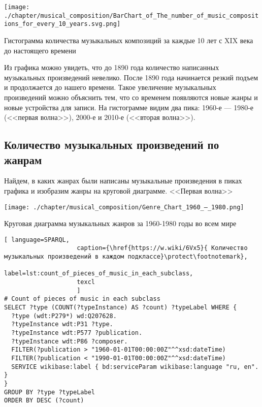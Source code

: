 \begin{marginfigure}[0\baselineskip]
	\texttt{[image: ./chapter/musical\_composition/BarChart\_of\_The\_number\_of\_music\_compositions\_for\_every\_10\_years.svg.png]}
	\caption[Гистограмма количества музыкальных композиций за каждые 10 лет с XIX века до настоящего времени]{Гистограмма количества музыкальных композиций за каждые 10 лет с XIX века до настоящего времени}%
\end{marginfigure}
Из графика можно увидеть, что до 1890 года количество написанных музыкальных произведений невелико. После 1890 года начинается резкий подъем и продолжается до нашего времени. Такое увеличение музыкальных произведений можно объяснить тем, что со временем появляются новые жанры и новые устройства для записи. На гистограмме видим два пика: 1960-е — 1980-е (<<первая волна>>), 2000-е и 2010-е (<<вторая волна>>).


\subsection{Количество музыкальных произведений по жанрам}
Найдем, в каких жанрах были написаны музыкальные произведения в пиках графика и изобразим жанры на круговой диаграмме. <<Первая волна>>
\begin{marginfigure}[0\baselineskip]
	\texttt{[image: ./chapter/musical\_composition/Genre\_Chart\_1960\_—\_1980.png]}
	\caption[Круговая диаграмма музыкальных жанров за 1960-1980 годы во всем мире]{Круговая диаграмма музыкальных жанров за 1960-1980 годы во всем мире}%
\end{marginfigure}
\begin{lstlisting}[ language=SPARQL,
                    caption={\href{https://w.wiki/6Vx5}{ Количество музыкальных произведений в каждом подклассе}\protect\footnotemark},
                    label=lst:count_of_pieces_of_music_in_each_subclass,
                    texcl 
                    ]
# Count of pieces of music in each subclass
SELECT ?type (COUNT(?typeInstance) AS ?count) ?typeLabel WHERE {
  ?type (wdt:P279*) wd:Q207628.
  ?typeInstance wdt:P31 ?type.
  ?typeInstance wdt:P577 ?publication.
  ?typeInstance wdt:P86 ?composer.
  FILTER(?publication > "1960-01-01T00:00:00Z"^^xsd:dateTime)        
  FILTER(?publication < "1990-01-01T00:00:00Z"^^xsd:dateTime)
  SERVICE wikibase:label { bd:serviceParam wikibase:language "ru, en". }
}
GROUP BY ?type ?typeLabel
ORDER BY DESC (?count)
\end{lstlisting}%



